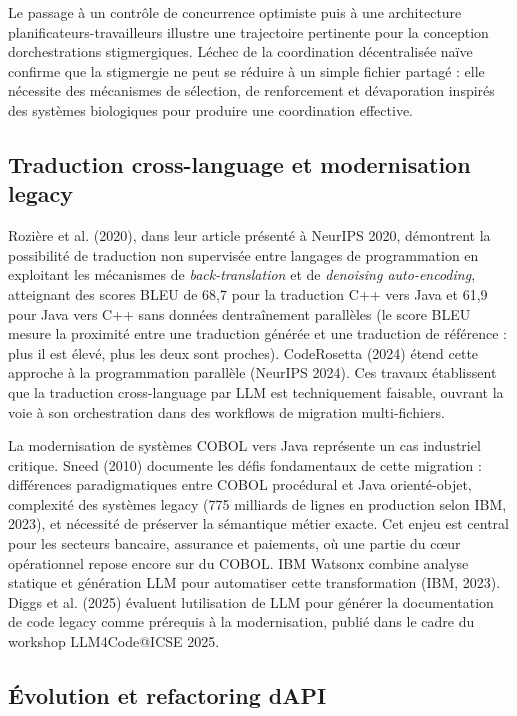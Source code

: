 \documentclass[12pt,a4paper]{article}
\begin{document}
Le passage à un contrôle de concurrence optimiste puis à une
architecture planificateurs-travailleurs illustre une trajectoire
pertinente pour la conception d\textquotesingle orchestrations
stigmergiques. L\textquotesingle échec de la coordination décentralisée
naïve confirme que la stigmergie ne peut se réduire à un simple fichier
partagé : elle nécessite des mécanismes de sélection, de renforcement et
d\textquotesingle évaporation inspirés des systèmes biologiques pour
produire une coordination effective.

\subsection{Traduction cross-language et modernisation
legacy}\label{traduction-cross-language-et-modernisation-legacy}

Rozière et al. (2020), dans leur article présenté à NeurIPS 2020,
démontrent la possibilité de traduction non supervisée entre langages de
programmation en exploitant les mécanismes de \emph{back-translation} et
de \emph{denoising auto-encoding}, atteignant des scores BLEU de 68,7
pour la traduction C++ vers Java et 61,9 pour Java vers C++ sans données
d\textquotesingle entraînement parallèles (le score BLEU mesure la
proximité entre une traduction générée et une traduction de référence :
plus il est élevé, plus les deux sont proches). CodeRosetta (2024) étend
cette approche à la programmation parallèle (NeurIPS 2024). Ces travaux
établissent que la traduction cross-language par LLM est techniquement
faisable, ouvrant la voie à son orchestration dans des workflows de
migration multi-fichiers.

La modernisation de systèmes COBOL vers Java représente un cas
industriel critique. Sneed (2010) documente les défis fondamentaux de
cette migration : différences paradigmatiques entre COBOL procédural et
Java orienté-objet, complexité des systèmes legacy (775 milliards de
lignes en production selon IBM, 2023), et nécessité de préserver la
sémantique métier exacte. Cet enjeu est central pour les secteurs
bancaire, assurance et paiements, où une partie du cœur opérationnel
repose encore sur du COBOL. IBM Watsonx combine analyse statique et
génération LLM pour automatiser cette transformation (IBM, 2023). Diggs
et al. (2025) évaluent l\textquotesingle utilisation de LLM pour générer
la documentation de code legacy comme prérequis à la modernisation,
publié dans le cadre du workshop LLM4Code@ICSE 2025.

\subsection{Évolution et refactoring
d\textquotesingle API}\label{uxe9volution-et-refactoring-dapi}
\end{document}
